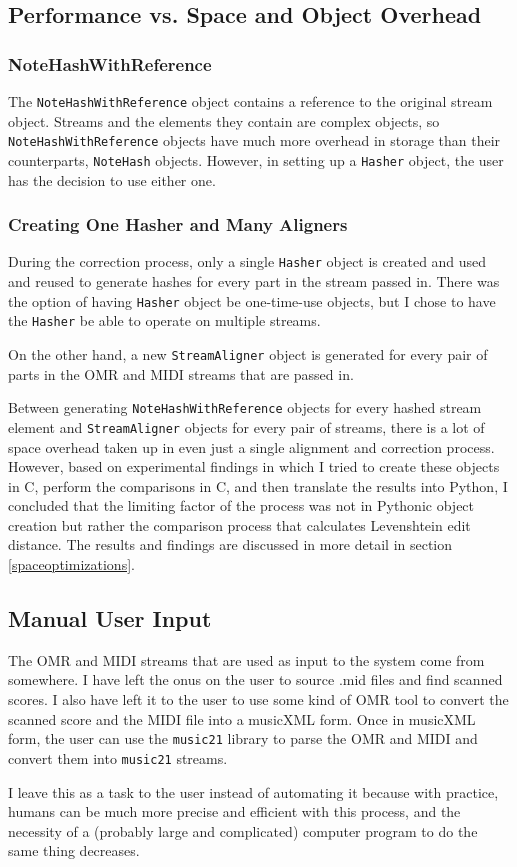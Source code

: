 \subsection{Performance vs. Space and Object Overhead}

\subsubsection{NoteHashWithReference}
The \texttt{NoteHashWithReference} object contains a reference to the original stream object. Streams and the elements they contain are complex objects, so \texttt{NoteHashWithReference} objects have much more overhead in storage than their counterparts, \texttt{NoteHash} objects. However, in setting up a \texttt{Hasher} object, the user has the decision to use either one.   

\subsubsection{Creating One Hasher and Many Aligners}
During the correction process, only a single \texttt{Hasher} object is created and used and reused to generate hashes for every part in the stream passed in. There was the option of having \texttt{Hasher} object be one-time-use objects, but I chose to have the \texttt{Hasher} be able to operate on multiple streams. 

On the other hand, a new \texttt{StreamAligner} object is generated for every pair of parts in the OMR and MIDI streams that are passed in. 

Between generating \texttt{NoteHashWithReference} objects for every hashed stream element and \texttt{StreamAligner} objects for every pair of streams, there is a lot of space overhead taken up in even just a single alignment and correction process. However, based on experimental findings in which I tried to create these objects in C, perform the comparisons in C, and then translate the results into Python, I concluded that the limiting factor of the process was not in Pythonic object creation but rather the comparison process that calculates Levenshtein edit distance. The results and findings are discussed in more detail in section \ref{spaceoptimizations}.


\subsection{Manual User Input}
The OMR and MIDI streams that are used as input to the system come from somewhere. I have left the onus on the user to source .mid files and find scanned scores. I also have left it to the user to use some kind of OMR tool to convert the scanned score and the MIDI file into a musicXML form. Once in musicXML form, the user can use the \texttt{music21} library to parse the OMR and MIDI and convert them into \texttt{music21} streams. 

I leave this as a task to the user instead of automating it because with practice, humans can be much more precise and efficient with this process, and the necessity of a (probably large and complicated) computer program to do the same thing decreases. 
